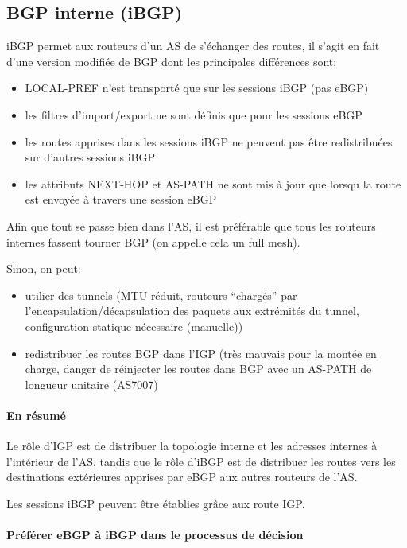 \documentclass{article}
\begin{document}
\begin{sffamily}
\subsection{BGP interne (iBGP)}

iBGP permet aux routeurs d'un AS de s'échanger des routes, il s'agit
en fait d'une version modifiée de BGP dont les principales différences
sont:

\begin{itemize}
\item LOCAL-PREF n'est transporté que sur les sessions iBGP (pas eBGP)
\item les filtres d'import/export ne sont définis que pour les
  sessions eBGP
\item les routes apprises dans les sessions iBGP ne peuvent pas être
  redistribuées sur d'autres sessions iBGP
\item les attributs NEXT-HOP et AS-PATH ne sont mis à jour que lorsqu
  la route est envoyée à travers une session eBGP
\end{itemize}

Afin que tout se passe bien dans l'AS, il est préférable que tous les
routeurs internes fassent tourner BGP (on appelle cela un full mesh).

Sinon, on peut:

\begin{itemize}
\item utilier des tunnels (MTU réduit, routeurs ``chargés'' par
  l'encapsulation/décapsulation des paquets aux extrémités du tunnel,
  configuration statique nécessaire (manuelle))
\item redistribuer les routes BGP dans l'IGP (très mauvais pour la
  montée en charge, danger de réinjecter les routes dans BGP avec un
  AS-PATH de longueur unitaire (AS7007)
\end{itemize}

\paragraph{En résumé}

Le rôle d'IGP est de distribuer la topologie interne et les adresses
internes à l'intérieur de l'AS, tandis que le rôle d'iBGP est de
distribuer les routes vers les destinations extérieures apprises par
eBGP aux autres routeurs de l'AS.

Les sessions iBGP peuvent être établies grâce aux route IGP.

\paragraph{Préférer eBGP à iBGP dans le processus de décision}


\end{sffamily}
\end{document}
